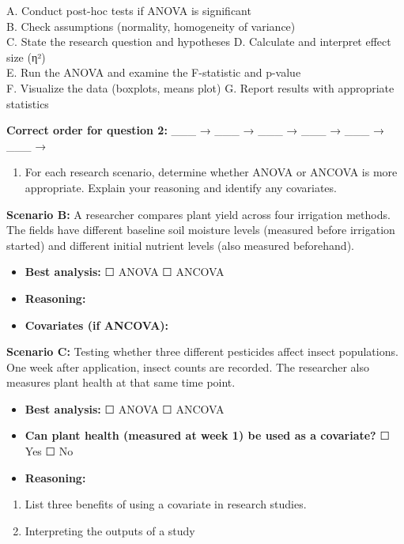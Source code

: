 \documentclass[
]{book}
\providecommand{\tightlist}{%
  \setlength{\itemsep}{0pt}\setlength{\parskip}{0pt}}
\begin{document}
A. Conduct post-hoc tests if ANOVA is significant\\
B. Check assumptions (normality, homogeneity of variance)\\
C. State the research question and hypotheses
D. Calculate and interpret effect size (η²)\\
E. Run the ANOVA and examine the F-statistic and p-value\\
F. Visualize the data (boxplots, means plot)
G. Report results with appropriate statistics

\textbf{Correct order for question 2:} \_\_\_ → \_\_\_ → \_\_\_ → \_\_\_ → \_\_\_ → \_\_\_ →

\begin{enumerate}
\def\labelenumi{\arabic{enumi}.}
\setcounter{enumi}{2}
\tightlist
\item
  For each research scenario, determine whether ANOVA or ANCOVA is more appropriate. Explain your reasoning and identify any covariates.
\end{enumerate}

\textbf{Scenario B:}
A researcher compares plant yield across four irrigation methods. The fields have different baseline soil moisture levels (measured before irrigation started) and different initial nutrient levels (also measured beforehand).

\begin{itemize}
\tightlist
\item
  \textbf{Best analysis:} ☐ ANOVA ☐ ANCOVA
\item
  \textbf{Reasoning:}
\item
  \textbf{Covariates (if ANCOVA):}
\end{itemize}

\textbf{Scenario C:}
Testing whether three different pesticides affect insect populations. One week after application, insect counts are recorded. The researcher also measures plant health at that same time point.

\begin{itemize}
\tightlist
\item
  \textbf{Best analysis:} ☐ ANOVA ☐ ANCOVA
\item
  \textbf{Can plant health (measured at week 1) be used as a covariate?} ☐ Yes ☐ No
\item
  \textbf{Reasoning:}
\end{itemize}

\begin{enumerate}
\def\labelenumi{\arabic{enumi}.}
\setcounter{enumi}{3}
\item
  List three benefits of using a covariate in research studies.
\item
  Interpreting the outputs of a study
\end{enumerate}
\end{document}
